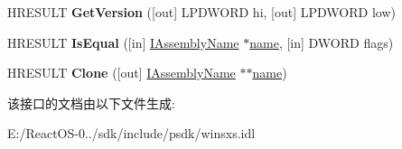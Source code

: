 \begin{DoxyCompactItemize}
\item 
\mbox{\label{interfaceunique_a157a8d0c6267d82e6f4e6785d3080bdd}} 
H\+R\+E\+S\+U\+LT {\bfseries Get\+Version} (\mbox{[}out\mbox{]} L\+P\+D\+W\+O\+RD hi, \mbox{[}out\mbox{]} L\+P\+D\+W\+O\+RD low)
\item 
\mbox{\label{interfaceunique_a33f46c281f03e4292b88420337f07a64}} 
H\+R\+E\+S\+U\+LT {\bfseries Is\+Equal} (\mbox{[}in\mbox{]} \hyperlink{interface_i_assembly_name}{I\+Assembly\+Name} $\ast$\hyperlink{structname}{name}, \mbox{[}in\mbox{]} D\+W\+O\+RD flags)
\item 
\mbox{\label{interfaceunique_afaa4bd600ad9f4fb34423504b6153533}} 
H\+R\+E\+S\+U\+LT {\bfseries Clone} (\mbox{[}out\mbox{]} \hyperlink{interface_i_assembly_name}{I\+Assembly\+Name} $\ast$$\ast$\hyperlink{structname}{name})
\end{DoxyCompactItemize}


该接口的文档由以下文件生成\+:\begin{DoxyCompactItemize}
\item 
E\+:/\+React\+O\+S-\/0../sdk/include/psdk/winsxs.\+idl\end{DoxyCompactItemize}
